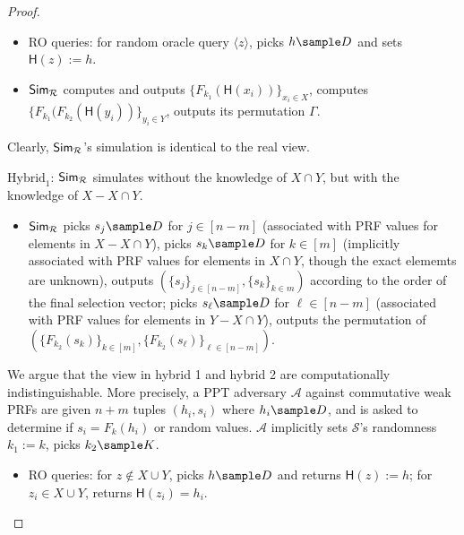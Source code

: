 \begin{proof}
\begin{trivlist}
\begin{itemize}
    \item RO queries: for random oracle query $\langle z \rangle$, picks $h \sample D$ and sets $\mathsf{H}(z):=h$. 

    \item $\mathsf{Sim}_\mathcal{R}$ computes and outputs 
        $\{F_{k_1}(\mathsf{H}(x_i))\}_{x_i \in X}$, 
        computes $\{F_{k_1}(F_{k_2}(\mathsf{H}(y_i))\}_{y_i \in Y}$, outputs its permutation $\Gamma$.      
\end{itemize}
Clearly, $\mathsf{Sim}_\mathcal{R}$'s simulation is identical to the real view. 

\begin{center}
\end{center}

\item $\text{Hybrid}_1$: $\mathsf{Sim}_\mathcal{R}$ simulates without the knowledge of $X \cap Y$, 
    but with the knowledge of $X - X \cap Y$.   
\begin{itemize}
    \item $\mathsf{Sim}_\mathcal{R}$ picks $s_j \sample D$ for $j \in [n-m]$ (associated with PRF values for elements in $X - X \cap Y$), 
        picks $s_k \sample D$ for $k \in [m]$ (implicitly associated with PRF values for elements in $X \cap Y$, 
        though the exact elememts are unknown), 
        outputs $(\{s_j\}_{j \in [n-m]}, \{s_k\}_{k \in m})$ according to the order of the final selection vector; 
        picks $s_\ell \sample D$ for $\ell \in [n-m]$ (associated with PRF values for elements in  $Y - X \cap Y$),  
        outputs the permutation of $(\{F_{k_2}(s_k)\}_{k \in [m]}, \{F_{k_2}(s_\ell)\}_{\ell \in [n-m]})$.                
\end{itemize}

We argue that the view in hybrid 1 and hybrid 2 are computationally indistinguishable. 
More precisely, a PPT adversary $\mathcal{A}$  against commutative weak PRFs 
are given $n+m$ tuples $(h_i, s_i)$ where $h_i \sample D$, and is asked to determine if $s_i = F_{k}(h_i)$ or random values. 
$\mathcal{A}$ implicitly sets $\mathcal{S}$'s randomness $k_1:=k$, picks $k_2 \sample K$. 
\begin{itemize}
    \item RO queries: for $z \notin X \cup Y$, picks $h \sample D$ and returns $\mathsf{H}(z):=h$; 
        for $z_i \in X \cup Y$, returns $\mathsf{H}(z_i) = h_i$. 


\end{itemize}
\end{trivlist}
\end{proof}
